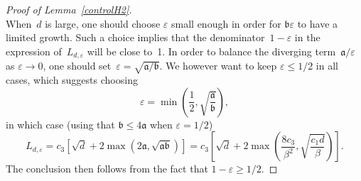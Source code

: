 \documentclass{article}
\renewcommand{\leq}{\leqslant}
\renewcommand{\geq}{\geqslant}
\begin{document}
\begin{proof}[Proof of Lemma~\ref{controlH2}]
\[\]
When~$d$ is large, one should choose $\varepsilon$ small enough in order for $\mathfrak{b}\varepsilon$ to have a limited growth. Such a choice implies that the denominator~$1-\varepsilon$ in the expression of~$L_{d,\varepsilon}$ will be close to~1. In order to balance the diverging term~$\mathfrak{a}/\varepsilon$ as $\varepsilon \to 0$, one should set~$\varepsilon = \sqrt{\mathfrak{a}/\mathfrak{b}}$. We however want to keep $\varepsilon \leq 1/2$ in all cases, which suggests choosing
\[
  \varepsilon = \min\left(\frac12, \sqrt{\frac{\mathfrak{a}}{\mathfrak{b}}}\right),
\]
in which case (using that $\mathfrak{b} \leq 4\mathfrak{a}$ when $\varepsilon = 1/2$)
\[
L_{d,\varepsilon} = c_3\left[\sqrt{d}+2 \max\left(2\mathfrak{a}, \sqrt{\mathfrak{a}\mathfrak{b}} \right)\right] = c_3\left[\sqrt{d}+2\max\left(\frac{8c_3}{\beta^2},\sqrt{\frac{c_1 d}{\beta}}\right) \right].
\]
The conclusion then follows from the fact that $1-\varepsilon \geq 1/2$.
\end{proof}
\end{document}
